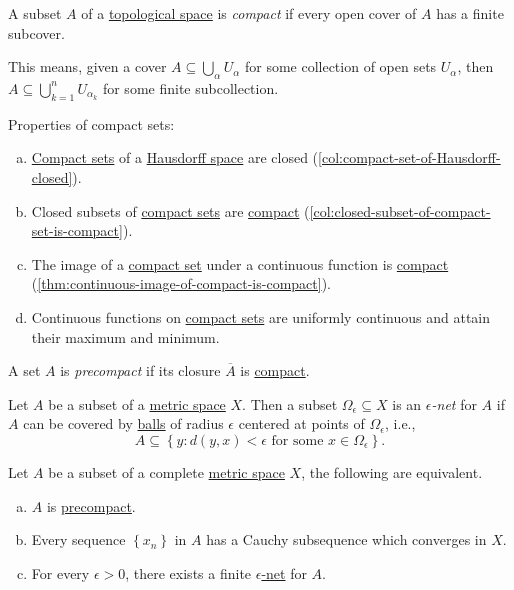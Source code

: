 \begin{definition}[Compact]\label{def:compact}
	A subset \(A\) of a \hyperref[def:topological-space]{topological space} is \emph{compact} if every open cover of \(A\) has a finite subcover.
\end{definition}

This means, given a cover \(A \subseteq \bigcup_{\alpha} U_\alpha \) for some collection of open sets \(U_\alpha \), then \(A \subseteq \bigcup_{k=1}^{n} U_{\alpha _k}\) for some finite subcollection.

\begin{remark}
	Properties of compact sets:
	\begin{enumerate}[(a)]
		\item \hyperref[def:compact]{Compact sets} of a \hyperref[def:Hausdorff]{Hausdorff space} are closed (\autoref{col:compact-set-of-Hausdorff-closed}).
		\item Closed subsets of \hyperref[def:compact]{compact sets} are \hyperref[def:compact]{compact} (\autoref{col:closed-subset-of-compact-set-is-compact}).
		\item The image of a \hyperref[def:compact]{compact set} under a continuous function is \hyperref[def:compact]{compact} (\autoref{thm:continuous-image-of-compact-is-compact}).
		\item Continuous functions on \hyperref[def:compact]{compact sets} are uniformly continuous and attain their maximum and minimum.
	\end{enumerate}
\end{remark}

\begin{definition}[Precompact]\label{def:precompact}
	A set \(A\) is \emph{precompact} if its closure \(\overline{A} \) is \hyperref[def:compact]{compact}.
\end{definition}

\begin{definition}\label{def:eps-net}
	Let \(A\) be a subset of a \hyperref[prev:metric]{metric space} \(X\). Then a subset \(\Omega _{\epsilon } \subseteq X\) is an \emph{\(\epsilon \)-net} for \(A\) if \(A\) can be covered by \hyperref[def:ball]{balls} of radius \(\epsilon \) centered at points of \(\Omega _{\epsilon }\), i.e.,
	\[
		A \subseteq \left\{ y\colon d(y, x) < \epsilon \text{ for some } x\in \Omega _\epsilon  \right\}.
	\]
\end{definition}

\begin{theorem}\label{thm:precompact}
	Let \(A\) be a subset of a complete \hyperref[prev:metric]{metric space} \(X\), the following are equivalent.
	\begin{enumerate}[(a)]
		\item \(A\) is \hyperref[def:precompact]{precompact}.
		\item Every sequence \(\left\{ x_n \right\} \)  in \(A\) has a Cauchy subsequence which converges in \(X\).
		\item For every \(\epsilon > 0\), there exists a finite \hyperref[def:eps-net]{\(\epsilon \)-net} for \(A\).
	\end{enumerate}
\end{theorem}

